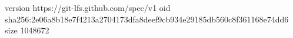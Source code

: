 version https://git-lfs.github.com/spec/v1
oid sha256:2e06a8b18e7f4213a2704173dfa8deef9cb934e29185db560c8f361168e74dd6
size 1048672
